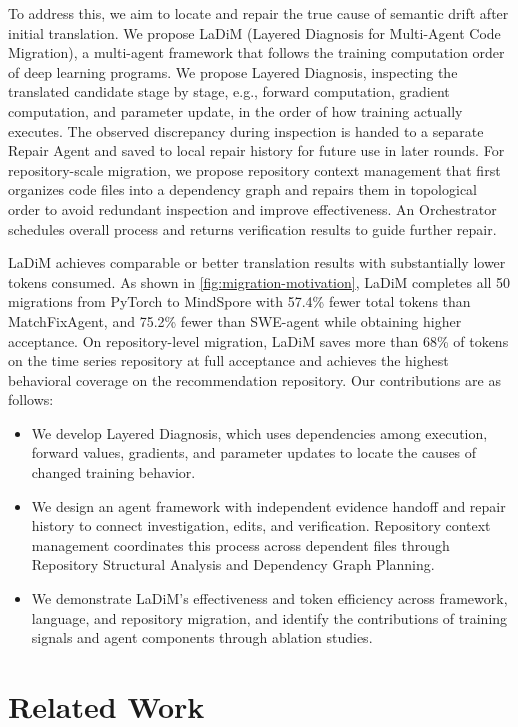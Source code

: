 \documentclass{article}
\begin{document}
{To address this, we aim to locate and repair the true cause of semantic drift after initial translation. We propose LaDiM (Layered Diagnosis for Multi-Agent Code Migration), a multi-agent framework that follows the training computation order of deep learning programs. We propose Layered Diagnosis, inspecting the translated candidate stage by stage, e.g., forward computation, gradient computation, and parameter update, in the order of how training actually executes. The observed discrepancy during inspection is handed to a separate Repair Agent and saved to local repair history for future use in later rounds. For repository-scale migration, we propose repository context management that first organizes code files into a dependency graph and repairs them in topological order to avoid redundant inspection and improve effectiveness. An Orchestrator schedules overall process and returns verification results to guide further repair.

LaDiM achieves comparable or better translation results with substantially lower tokens consumed. As shown in \cref{fig:migration-motivation}, LaDiM completes all 50 migrations from PyTorch to MindSpore with 57.4\% fewer total tokens than MatchFixAgent, and 75.2\% fewer than SWE-agent while obtaining higher acceptance. On repository-level migration, LaDiM saves more than 68\% of tokens on the time series repository at full acceptance and achieves the highest behavioral coverage on the recommendation repository. Our contributions are as follows:
\par}
\begin{itemize}
\item We develop Layered Diagnosis, which uses dependencies among execution, forward values, gradients, and parameter updates to locate the causes of changed training behavior.
\item We design an agent framework with independent evidence handoff and repair history to connect investigation, edits, and verification. Repository context management coordinates this process across dependent files through Repository Structural Analysis and Dependency Graph Planning.
\item We demonstrate LaDiM's effectiveness and token efficiency across framework, language, and repository migration, and identify the contributions of training signals and agent components through ablation studies.
\end{itemize}

\section{Related Work}
\end{document}
